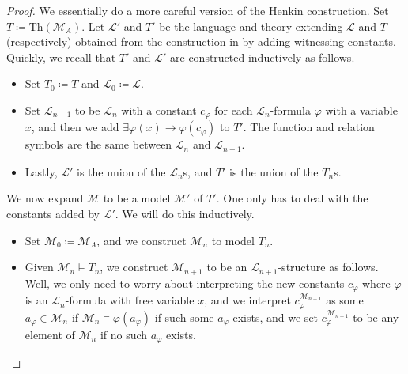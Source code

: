 \documentclass[../notes.tex]{subfiles}
\begin{document}
\begin{proof}
	We essentially do a more careful version of the Henkin construction. Set $T\coloneqq\mathrm{Th}(\mathcal M_A)$. Let $\mathcal L'$ and $T'$ be the language and theory extending $\mathcal L$ and $T$ (respectively) obtained from the construction in  by adding witnessing constants. Quickly, we recall that $T'$ and $\mathcal L'$ are constructed inductively as follows.
	\begin{itemize}
		\item Set $T_0\coloneqq T$ and $\mathcal L_0\coloneqq\mathcal L$.
		\item Set $\mathcal L_{n+1}$ to be $\mathcal L_n$ with a constant $c_\varphi$ for each $\mathcal L_n$-formula $\varphi$ with a variable $x$, and then we add $\exists\varphi(x)\to\varphi(c_\varphi)$ to $T'$. The function and relation symbols are the same between $\mathcal L_n$ and $\mathcal L_{n+1}$.
		\item Lastly, $\mathcal L'$ is the union of the $\mathcal L_n$s, and $T'$ is the union of the $T_n$s.
	\end{itemize}
	We now expand $\mathcal M$ to be a model $\mathcal M'$ of $T'$. One only has to deal with the constants added by $\mathcal L'$. We will do this inductively.
	\begin{itemize}
		\item Set $\mathcal M_0\coloneqq\mathcal M_A$, and we construct $\mathcal M_n$ to model $T_n$.
		\item Given $\mathcal M_n\models T_n$, we construct $\mathcal M_{n+1}$ to be an $\mathcal L_{n+1}$-structure as follows. Well, we only need to worry about interpreting the new constants $c_\varphi$ where $\varphi$ is an $\mathcal L_n$-formula with free variable $x$, and we interpret $c_\varphi^{\mathcal M_{n+1}}$ as some $a_\varphi\in\mathcal M_n$ if $\mathcal M_n\models\varphi(a_\varphi)$ if such some $a_\varphi$ exists, and we set $c_\varphi^{\mathcal M_{n+1}}$ to be any element of $\mathcal M_n$ if no such $a_\varphi$ exists.


\end{itemize}
\end{proof}
\end{document}
